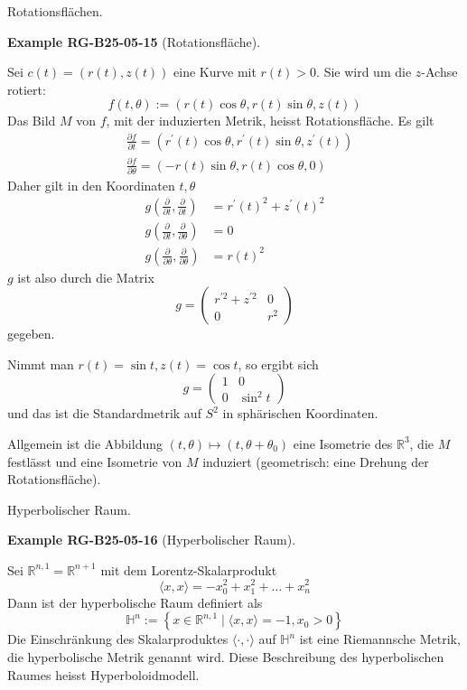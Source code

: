 \documentclass[10pt, letterpaper]{article}
\newcommand{\CustomHeading}[3]{%
  \par\medskip\noindent%
  \textbf{#1 #2} \textnormal{(#3)}.\enskip%
}
\newenvironment{EXA}[2]{\begin{unitbox}\CustomHeading{Example}{#1}{#2}}{\end{unitbox}}
\begin{document}
Rotationsflächen. 



\begin{EXA}{RG-B25-05-15}{Rotationsfläche}
Sei $c(t)=(r(t), z(t))$ eine Kurve mit $r(t)>0$. Sie wird um die $z$-Achse rotiert:
$$
f(t, \theta):=(r(t) \cos \theta, r(t) \sin \theta, z(t))
$$
Das Bild $M$ von $f$, mit der induzierten Metrik, heisst Rotationsfläche. Es gilt 
$$
\begin{aligned}
& \frac{\partial f}{\partial t}=\left(r^{\prime}(t) \cos \theta, r^{\prime}(t) \sin \theta, z^{\prime}(t)\right) \\
& \frac{\partial f}{\partial \theta}=(-r(t) \sin \theta, r(t) \cos \theta, 0)
\end{aligned}
$$
Daher gilt in den Koordinaten $t, \theta$
$$
\begin{aligned}
g\left(\frac{\partial}{\partial t}, \frac{\partial}{\partial t}\right) & =r^{\prime}(t)^{2}+z^{\prime}(t)^{2} \\
g\left(\frac{\partial}{\partial t}, \frac{\partial}{\partial \theta}\right) & =0 \\
g\left(\frac{\partial}{\partial \theta}, \frac{\partial}{\partial \theta}\right) & =r(t)^{2}
\end{aligned}
$$
$g$ ist also durch die Matrix
$$
g=\left(\begin{array}{cc}
r^{\prime 2}+z^{\prime 2} & 0 \\
0 & r^{2}
\end{array}\right)
$$
gegeben.


Nimmt man $r(t)=\sin t, z(t)=\cos t$, so ergibt sich
$$
g=\left(\begin{array}{cc}
1 & 0 \\
0 & \sin ^{2} t
\end{array}\right)
$$
und das ist die Standardmetrik auf $S^{2}$ in sphärischen Koordinaten.

Allgemein ist die Abbildung $(t, \theta) \mapsto\left(t, \theta+\theta_{0}\right)$ eine Isometrie des $\mathbb{R}^{3}$, die $M$ festlässt und eine Isometrie von $M$ induziert (geometrisch: eine Drehung der Rotationsfläche).
\end{EXA}






Hyperbolischer Raum. 


\begin{EXA}{RG-B25-05-16}{Hyperbolischer Raum}
Sei $\mathbb{R}^{n, 1}=\mathbb{R}^{n+1}$ mit dem Lorentz-Skalarprodukt
$$
\langle x, x\rangle=-x_{0}^{2}+x_{1}^{2}+\ldots+x_{n}^{2}
$$
Dann ist der hyperbolische Raum definiert als
$$
\mathbb{H}^{n}:=\left\{x \in \mathbb{R}^{n, 1} \mid\langle x, x\rangle=-1, x_{0}>0\right\}
$$
Die Einschränkung des Skalarproduktes $\langle\cdot, \cdot\rangle$ auf $\mathbb{H}^{n}$ ist eine Riemannsche Metrik, die hyperbolische Metrik genannt wird. Diese Beschreibung des hyperbolischen Raumes heisst Hyperboloidmodell.
\end{EXA}
\end{document}
